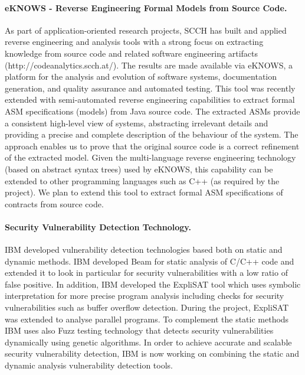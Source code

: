 \documentclass[a4paper,11pt]{article}
\begin{document}
\paragraph{\SCCHshort{} eKNOWS - Reverse Engineering Formal Models from Source Code.}
As part of application-oriented research projects, SCCH has built and applied reverse engineering and analysis tools with a strong focus on extracting knowledge from source code and related software engineering artifacts (http://codeanalytics.scch.at/). The results are made available via eKNOWS, a platform for the analysis and evolution of software systems, documentation generation, and quality assurance and automated testing. This tool was recently extended with semi-automated reverse engineering capabilities to extract formal ASM specifications (models) from Java source code. The extracted ASMs provide a consistent high-level view of systems, abstracting irrelevant details and providing a precise and complete description of the behaviour of the system. The approach enables us to prove that the original source code is a correct refinement of the extracted model. Given the multi-language reverse engineering technology (based on abstract syntax trees) used by eKNOWS, this capability can be extended to other programming languages such as C++ (as required by the project). We plan to extend this tool to extract formal ASM specifications of contracts from source code.    

\paragraph{\IBM{} Security Vulnerability Detection Technology.}

IBM developed vulnerability detection technologies based both on static and dynamic methods. IBM developed Beam for static analysis of C/C++ code and extended it to look in particular for security vulnerabilities with a low ratio of false positive. In addition, IBM developed the ExpliSAT tool which uses symbolic interpretation for more precise program analysis including checks for security vulnerabilities such as buffer overflow detection. During the \rephrase{} project, ExpliSAT was extended to analyse parallel programs. To complement the static methods IBM uses also Fuzz testing technology that detects security vulnerabilities dynamically using genetic algorithms. In order to achieve accurate and scalable security vulnerability detection, IBM is now working on combining the static and dynamic analysis vulnerability detection tools.     
\end{document}
